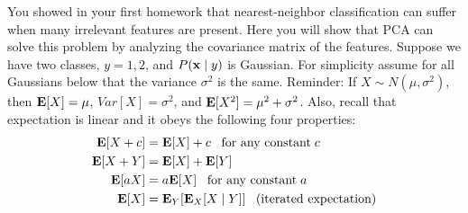 You showed in your first homework that nearest-neighbor classification
can suffer when many irrelevant features are present.  Here you will
show that PCA can solve this problem by analyzing the covariance
matrix of the features.  Suppose we have two classes, $y = 1, 2$, and
$P(\mathbf{x} \mid y)$ is Gaussian.  For simplicity assume for all Gaussians
below that the variance $\sigma^2$ is the same.  Reminder: If $X \sim
N(\mu,\sigma^2)$, then $\mathbf{E}[X] = \mu$, $Var[X] = \sigma^2$, and
$\mathbf{E}[X^2] = \mu^2 + \sigma^2$.  Also, recall that expectation is linear
and it obeys the following four properties:
\begin{align*}
\mathbf{E}[X + c] =&\; \mathbf{E}[X] + c\;\;\; \textrm{for any constant}\; c \\
\mathbf{E}[X + Y] =&\; \mathbf{E}[X] + \mathbf{E}[Y] \\
\mathbf{E}[aX] =&\; a\mathbf{E}[X]\;\;\; \textrm{for any constant}\; a \\
\mathbf{E}[X] =&\; \mathbf{E}_Y [ \mathbf{E}_X [X \mid Y] ] \;\;\; \textrm{(iterated expectation)}
\end{align*}

